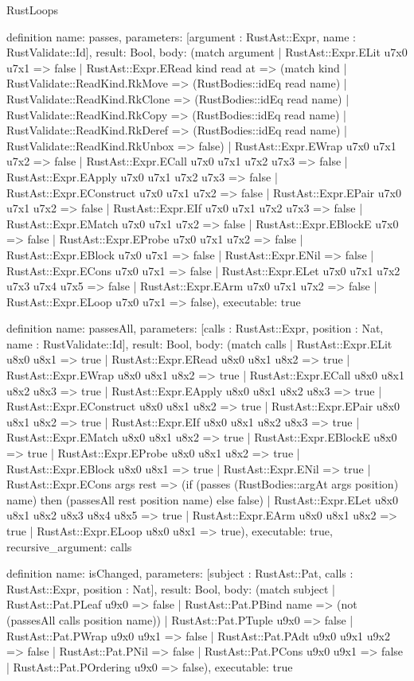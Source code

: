 \begin{lexlean}{RustLoops}
\begin{semanticmodule}
definition{
  name: passes,
  parameters: [argument : RustAst::Expr, name : RustValidate::Id],
  result: Bool,
  body: (match argument
    | RustAst::Expr.ELit u7x0 u7x1 => false
    | RustAst::Expr.ERead kind read at => (match kind
      | RustValidate::ReadKind.RkMove => (RustBodies::idEq read name)
      | RustValidate::ReadKind.RkClone => (RustBodies::idEq read name)
      | RustValidate::ReadKind.RkCopy => (RustBodies::idEq read name)
      | RustValidate::ReadKind.RkDeref => (RustBodies::idEq read name)
      | RustValidate::ReadKind.RkUnbox => false)
    | RustAst::Expr.EWrap u7x0 u7x1 u7x2 => false
    | RustAst::Expr.ECall u7x0 u7x1 u7x2 u7x3 => false
    | RustAst::Expr.EApply u7x0 u7x1 u7x2 u7x3 => false
    | RustAst::Expr.EConstruct u7x0 u7x1 u7x2 => false
    | RustAst::Expr.EPair u7x0 u7x1 u7x2 => false
    | RustAst::Expr.EIf u7x0 u7x1 u7x2 u7x3 => false
    | RustAst::Expr.EMatch u7x0 u7x1 u7x2 => false
    | RustAst::Expr.EBlockE u7x0 => false
    | RustAst::Expr.EProbe u7x0 u7x1 u7x2 => false
    | RustAst::Expr.EBlock u7x0 u7x1 => false
    | RustAst::Expr.ENil => false
    | RustAst::Expr.ECons u7x0 u7x1 => false
    | RustAst::Expr.ELet u7x0 u7x1 u7x2 u7x3 u7x4 u7x5 => false
    | RustAst::Expr.EArm u7x0 u7x1 u7x2 => false
    | RustAst::Expr.ELoop u7x0 u7x1 => false),
  executable: true
}

definition{
  name: passesAll,
  parameters: [calls : RustAst::Expr, position : Nat, name : RustValidate::Id],
  result: Bool,
  body: (match calls
    | RustAst::Expr.ELit u8x0 u8x1 => true
    | RustAst::Expr.ERead u8x0 u8x1 u8x2 => true
    | RustAst::Expr.EWrap u8x0 u8x1 u8x2 => true
    | RustAst::Expr.ECall u8x0 u8x1 u8x2 u8x3 => true
    | RustAst::Expr.EApply u8x0 u8x1 u8x2 u8x3 => true
    | RustAst::Expr.EConstruct u8x0 u8x1 u8x2 => true
    | RustAst::Expr.EPair u8x0 u8x1 u8x2 => true
    | RustAst::Expr.EIf u8x0 u8x1 u8x2 u8x3 => true
    | RustAst::Expr.EMatch u8x0 u8x1 u8x2 => true
    | RustAst::Expr.EBlockE u8x0 => true
    | RustAst::Expr.EProbe u8x0 u8x1 u8x2 => true
    | RustAst::Expr.EBlock u8x0 u8x1 => true
    | RustAst::Expr.ENil => true
    | RustAst::Expr.ECons args rest => (if (passes (RustBodies::argAt args position) name) then (passesAll rest position name) else false)
    | RustAst::Expr.ELet u8x0 u8x1 u8x2 u8x3 u8x4 u8x5 => true
    | RustAst::Expr.EArm u8x0 u8x1 u8x2 => true
    | RustAst::Expr.ELoop u8x0 u8x1 => true),
  executable: true,
  recursive_argument: calls
}

definition{
  name: isChanged,
  parameters: [subject : RustAst::Pat, calls : RustAst::Expr, position : Nat],
  result: Bool,
  body: (match subject
    | RustAst::Pat.PLeaf u9x0 => false
    | RustAst::Pat.PBind name => (not (passesAll calls position name))
    | RustAst::Pat.PTuple u9x0 => false
    | RustAst::Pat.PWrap u9x0 u9x1 => false
    | RustAst::Pat.PAdt u9x0 u9x1 u9x2 => false
    | RustAst::Pat.PNil => false
    | RustAst::Pat.PCons u9x0 u9x1 => false
    | RustAst::Pat.POrdering u9x0 => false),
  executable: true
}


\end{semanticmodule}
\end{lexlean}
